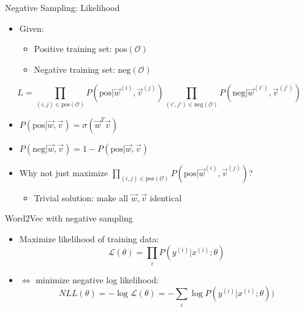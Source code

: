 \documentclass[11pt,compress,t,notes=noshow, xcolor=table]{beamer}
\begin{document}
\begin{vbframe}{Negative Sampling: Likelihood}

\vfill

\begin{itemize}
	\item Given:
		\begin{itemize}
			\item Positive training set: $\mathrm{pos}(\mathcal{O})$
			\item Negative training set: $\mathrm{neg}(\mathcal{O})$
		\end{itemize}
\end{itemize}

	$$ L = \prod_{(i,j) \in \mathrm{pos}(\mathcal{O})} P(\mathrm{pos}|\vec w^{(i)}, \vec v^{(j)}) \prod_{(i',j') \in \mathrm{neg}(\mathcal{O})} P(\mathrm{neg}|\vec w^{(i')},\vec v^{(j')} ) $$
	
\begin{itemize}
	\item $P(\mathrm{pos}|\vec w, \vec v) = \sigma(\vec w^T \vec v)$
	\item $P(\mathrm{neg}|\vec w, \vec v) = 1-P(\mathrm{pos}|\vec w, \vec v)$
	\item \ques Why not just maximize $\displaystyle \prod_{(i,j) \in \mathrm{pos}(\mathcal{O})} P(\mathrm{pos}|\vec w^{(i)}, \vec v^{(j)}) $?
		\begin{itemize}
		\item Trivial solution: make all $\vec w, \vec v$ identical
		\end{itemize}
\end{itemize}

\vfill

\end{vbframe}


\begin{vbframe}{Word2Vec with negative sampling}

\vfill

\begin{itemize}
	\item Maximize likelihood of training data:
	$$\mathcal{L}(\theta) = \prod_{i} P(y^{(i)}|x^{(i)}; \theta)$$
	\item[] $\Leftrightarrow$ minimize negative log likelihood:
	$$NLL(\theta) = - \log \mathcal{L}(\theta) = - \sum_{i} \log P(y^{(i)}|x^{(i)}; \theta))$$
\end{itemize}

\vfill

\end{vbframe}
\end{document}
